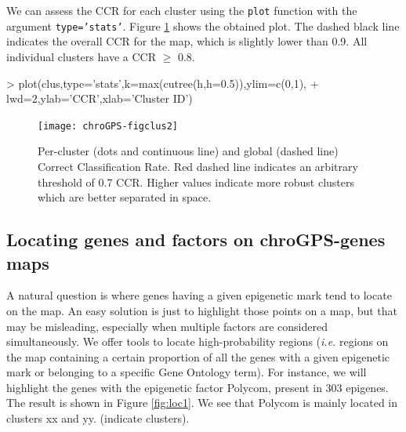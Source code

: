\documentclass[a4paper,12pt,nogin]{article}
\newcommand{\newtext}[1]{{\color{blue} #1}} %
\newcommand{\drcomment}[1]{{\color{red} #1}} %
\begin{document}
\newtext{
We can assess the CCR for each cluster using the \texttt{plot} function with the argument \texttt{type='stats'}.
Figure \ref{fig:clus2} shows the obtained plot. The dashed black line indicates the overall CCR for the map,
which is slightly lower than 0.9. All individual clusters have a CCR $\geq$ 0.8.  
}

\footnotesize
 
\begin{Schunk}
\begin{Sinput}
> plot(clus,type='stats',k=max(cutree(h,h=0.5)),ylim=c(0,1),
+ lwd=2,ylab='CCR',xlab='Cluster ID')
\end{Sinput}
\end{Schunk}
 
\normalsize
 
\begin{figure}
\begin{center}
\texttt{[image: chroGPS-figclus2]}
\end{center}
\caption{Per-cluster (dots and continuous line) and global (dashed line) Correct Classification Rate. Red dashed line indicates an arbitrary threshold of 0.7 CCR. Higher values indicate more robust clusters which are better separated in space. }
\label{fig:clus2}
\end{figure}

\normalsize

\subsection{Locating genes and factors on chroGPS-genes maps}
\label{sec:locateGPS}

\newtext{A natural question is}
where genes having a
given epigenetic mark tend to locate on the map. An easy solution is
just to highlight those points on a map, but that may be misleading,
\newtext{especially when multiple factors are considered simultaneously.}
We offer tools to locate \newtext{high-probability} regions 
({\it i.e.} regions on
the map containing a certain proportion of all the genes with a given
epigenetic mark or belonging to a specific Gene Ontology term). 
For
instance, we will highlight the genes with the epigenetic factor Polycom, present in 303 epigenes.
\newtext{The result is shown in Figure \ref{fig:loc1}. We see that Polycom is mainly located in clusters xx and yy.}
\drcomment{(indicate clusters).}
\end{document}
